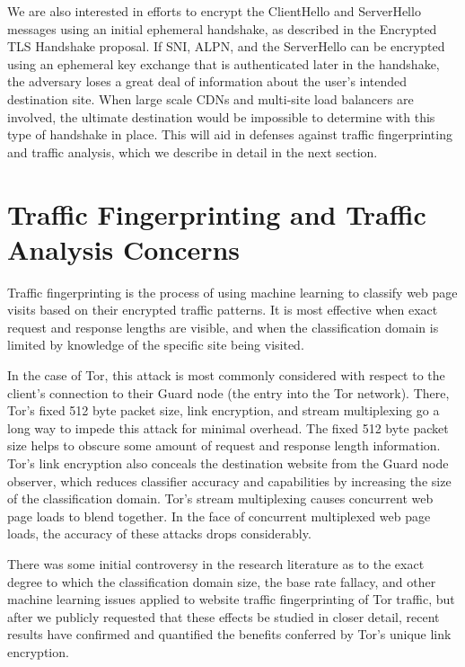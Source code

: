 \documentclass[letterpaper,11pt]{llncs}
\begin{document}
We are also interested in efforts to encrypt the ClientHello and ServerHello
messages using an initial ephemeral handshake, as described in the Encrypted
TLS Handshake proposal\cite{encrypted-handshake}. If SNI, ALPN, and the
ServerHello can be encrypted using an ephemeral key exchange that is
authenticated later in the handshake, the adversary loses a great deal of
information about the user's intended destination site. When large scale CDNs
and multi-site load balancers are involved, the ultimate destination would be
impossible to determine with this type of handshake in place. This will aid in
defenses against traffic fingerprinting and traffic analysis, which we
describe in detail in the next section.

\section{Traffic Fingerprinting and Traffic Analysis Concerns}

Traffic fingerprinting is the process of using machine learning to
classify web page visits based on their encrypted traffic patterns. It is most
effective when exact request and response lengths are visible, and when the
classification domain is limited by knowledge of the specific site being
visited.

In the case of Tor, this attack is most commonly considered with respect to
the client's connection to their Guard node (the entry into the Tor network).
There, Tor's fixed 512 byte packet size, link encryption, and stream
multiplexing go a long way to impede this attack for minimal overhead. The
fixed 512 byte packet size helps to obscure some amount of request and
response length information. Tor's link encryption also conceals the
destination website from the Guard node observer, which reduces classifier
accuracy and capabilities by increasing the size of the classification domain.
Tor's stream multiplexing causes concurrent web page loads to blend together.
In the face of concurrent multiplexed web page loads, the accuracy of these
attacks drops considerably.

There was some initial controversy in the research literature as to the exact
degree to which the classification domain size, the base rate fallacy, and
other machine learning issues applied to website traffic fingerprinting of Tor
traffic, but after we publicly requested that these effects be studied in
closer detail\cite{blog-wtf}, recent results have confirmed and quantified the
benefits conferred by Tor's unique link encryption\cite{ccs-wtf}.
\end{document}
